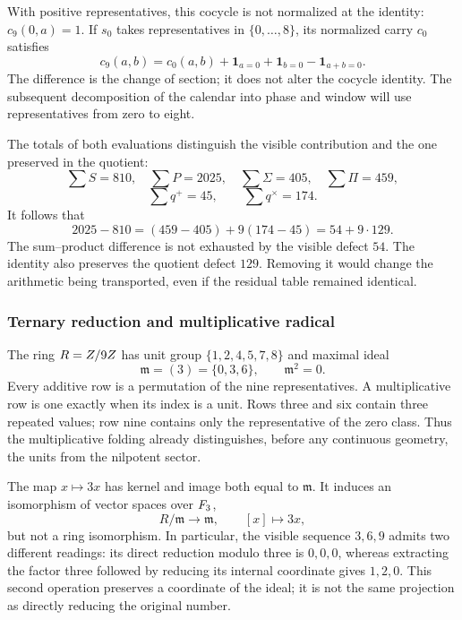 With positive representatives, this cocycle is not normalized at the identity: \(c_9(0,a)=1\). If \(s_0\) takes representatives in \(\{0,\ldots,8\}\), its normalized carry \(c_0\) satisfies
\[
 c_9(a,b)=c_0(a,b)+\mathbf1_{a=0}+\mathbf1_{b=0}-\mathbf1_{a+b=0}.
\]
The difference is the change of section; it does not alter the cocycle identity. The subsequent decomposition of the calendar into phase and window will use representatives from zero to eight.

The totals of both evaluations distinguish the visible contribution and the one preserved in the quotient:
\[
 \sum S=810,\quad\sum P=2025,\quad
 \sum\Sigma=405,\quad\sum\Pi=459,
\]
\[
 \sum q^+=45,\qquad\sum q^\times=174.
\]
It follows that
\begin{equation}
 2025-810=(459-405)+9(174-45)=54+9\cdot129.
 \label{x_reciprocidad:eq:defecto-integrado}
\end{equation}
The sum--product difference is not exhausted by the visible defect \(54\). The identity also preserves the quotient defect \(129\). Removing it would change the arithmetic being transported, even if the residual table remained identical.

\subsubsection{Ternary reduction and multiplicative radical}

The ring \(R=Z/9Z\) has unit group \(\{1,2,4,5,7,8\}\) and maximal ideal
\[
 \mathfrak m=(3)=\{0,3,6\},\qquad\mathfrak m^2=0.
\]
Every additive row is a permutation of the nine representatives. A multiplicative row is one exactly when its index is a unit. Rows three and six contain three repeated values; row nine contains only the representative of the zero class. Thus the multiplicative folding already distinguishes, before any continuous geometry, the units from the nilpotent sector.

The map \(x\mapsto3x\) has kernel and image both equal to \(\mathfrak m\). It induces an isomorphism of vector spaces over \(F_3\),
\[
 R/\mathfrak m\longrightarrow\mathfrak m,\qquad [x]\longmapsto3x,
\]
but not a ring isomorphism. In particular, the visible sequence \(3,6,9\) admits two different readings: its direct reduction modulo three is \(0,0,0\), whereas extracting the factor three followed by reducing its internal coordinate gives \(1,2,0\). This second operation preserves a coordinate of the ideal; it is not the same projection as directly reducing the original number.

